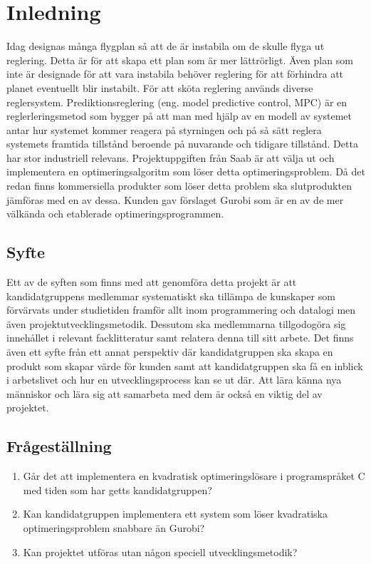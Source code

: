\section{Inledning}
Idag designas många flygplan så att de är instabila om de skulle flyga ut reglering. Detta är för att skapa ett plan som är mer lättrörligt. Även plan som inte är designade för att vara instabila behöver reglering för att förhindra att planet eventuellt blir instabilt. För att sköta reglering används diverse reglersystem. \citep{airplanestability}
\newline
\newline
Prediktionsreglering (eng. model predictive control, MPC) är en reglerleringsmetod som 
bygger på att man med hjälp av en modell av systemet antar hur systemet kommer reagera på styrningen och på så sätt reglera systemets framtida tillstånd beroende på nuvarande och tidigare tillstånd. Detta har stor industriell relevans.\citep[2]{ir}
\newline
\newline
Projektuppgiften från Saab är att välja ut och implementera en optimeringsalgoritm som löser detta optimeringsproblem. Då det redan finns kommersiella produkter som löser detta problem ska slutprodukten jämföras med en av dessa. Kunden gav förslaget Gurobi som är en av de mer välkända och etablerade optimeringsprogrammen.

\subsection{Syfte}
Ett av de syften som finns med att genomföra detta projekt är att kandidatgruppens medlemmar systematiskt ska tillämpa de kunskaper som förvärvats under studietiden framför allt inom programmering och datalogi men även projektutvecklingsmetodik. Dessutom ska medlemmarna tillgodogöra sig innehållet i relevant facklitteratur samt relatera denna till sitt arbete. 
Det finns även ett syfte från ett annat perspektiv där kandidatgruppen ska skapa en produkt som skapar värde för kunden samt att kandidatgruppen ska få en inblick i arbetslivet och hur en utvecklingsprocess kan se ut där. Att lära känna nya människor och lära sig att samarbeta med dem är också en viktig del av projektet. \citep{tddd77}

\subsection{Frågeställning}
	\begin{enumerate}
		\item Går det att implementera en kvadratisk optimeringslösare i programspråket C med tiden som har getts kandidatgruppen?
		\item Kan kandidatgruppen implementera ett system som löser kvadratiska optimeringsproblem snabbare än Gurobi?
		\item Kan projektet utföras utan någon speciell utvecklingsmetodik? 
	\end{enumerate}

